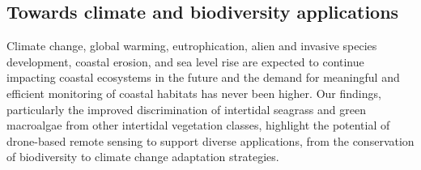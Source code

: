 \documentclass[
  number]{elsarticle}
\begin{document}
\subsection{Towards climate and biodiversity
applications}\label{towards-climate-and-biodiversity-applications}

Climate change, global warming, eutrophication, alien and invasive
species development, coastal erosion, and sea level rise are expected to
continue impacting coastal ecosystems in the future
\citep{SCHIBALSKI2022101414, holon2018predictive, marquet2024global} and
the demand for meaningful and efficient monitoring of coastal habitats
has never been
higher\citep{muller2018satellite, villalobos2023remote, oiry2021using}.
Our findings, particularly the improved discrimination of intertidal
seagrass and green macroalgae from other intertidal vegetation classes,
highlight the potential of drone-based remote sensing to support diverse
applications, from the conservation of biodiversity to climate change
adaptation strategies.
\end{document}
